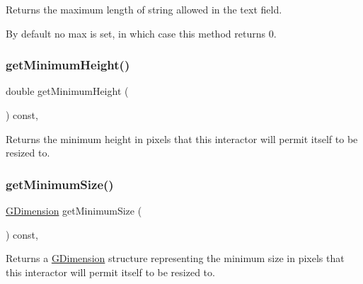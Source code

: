 Returns the maximum length of string allowed in the text field. 

By default no max is set, in which case this method returns 0. \mbox{\label{classGInteractor_aed4b0075fcc434499c3cb3e46896bda3}} 
\subsubsection{\texorpdfstring{get\+Minimum\+Height()}{getMinimumHeight()}}
{\footnotesize\ttfamily double get\+Minimum\+Height (\begin{DoxyParamCaption}{ }\end{DoxyParamCaption}) const\hspace{0.3cm}{\ttfamily [virtual]}, {\ttfamily [inherited]}}



Returns the minimum height in pixels that this interactor will permit itself to be resized to. 

\mbox{\label{classGInteractor_a66b5af0b32493b4d597ca0a3df2049ea}} 
\subsubsection{\texorpdfstring{get\+Minimum\+Size()}{getMinimumSize()}}
{\footnotesize\ttfamily \mbox{\hyperlink{classGDimension}{G\+Dimension}} get\+Minimum\+Size (\begin{DoxyParamCaption}{ }\end{DoxyParamCaption}) const\hspace{0.3cm}{\ttfamily [virtual]}, {\ttfamily [inherited]}}



Returns a \mbox{\hyperlink{classGDimension}{G\+Dimension}} structure representing the minimum size in pixels that this interactor will permit itself to be resized to. 

\mbox{\label{classGInteractor_a59e668114fe3d49d2a0f28deb258f7c8}} 
